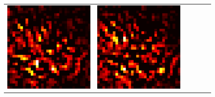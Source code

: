 \documentclass[preprint,12pt]{elsarticle}
\begin{document}
\begin{figure}[p]
\begin{tabular}{cccccc}
  \includegraphics[scale=\scale]{../visualizations/examples/cifar10/resnet18/active_saliency_map/8.png} & 
  \includegraphics[scale=\scale]{../visualizations/examples/cifar10/resnet18/inactive_saliency_map/8.png} \\
  

\end{tabular}
\end{figure}
\end{document}
